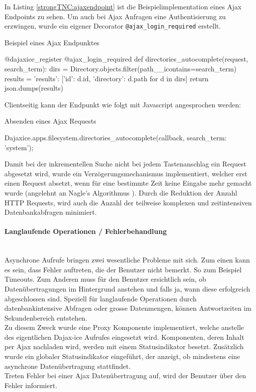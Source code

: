 In Listing \ref{strongTNC:ajaxendpoint} ist die Beispielimplementation eines Ajax Endpoints zu sehen. Um auch bei Ajax Anfragen eine Authentisierung zu erzwingen, wurde ein eigener Decorator \texttt{@ajax\_login\_required} erstellt. 

\begin{listing}[H]
\caption{Beispiel eines Ajax Endpunktes}
\label{strongTNC:ajaxendpoint}
\begin{pythoncode}
@dajaxice_register
@ajax_login_required
def directories_autocomplete(request, search_term):
    dirs = Directory.objects.filter(path__icontains=search_term)
    results = {'results': [{'id': d.id, 'directory': d.path} for d in dirs]}
    return json.dumps(results)
\end{pythoncode}
\end{listing}

Clientseitig kann der Endpunkt wie folgt mit Javascript angesprochen werden:
\begin{listing}[H]
\caption{Absenden eines Ajax Requests}
\begin{jscode}
Dajaxice.apps.filesystem.directories_autocomplete(callback, {search_term: 'system'});
\end{jscode} 
\end{listing}

Damit bei der inkrementellen Suche nicht bei jedem Tastenanschlag ein Request
abgesetzt wird, wurde ein Verzögerungsmechanismus implementiert, welcher erst einen Request
absetzt, wenn für eine bestimmte Zeit keine Eingabe mehr gemacht wurde (angelehnt an Nagle's Algorithmus \cite{nagle1984congestion}).
Durch die Reduktion der Anzahl HTTP Requests, wird auch die Anzahl der teilweise komplexen und zeitintensiven Datenbankabfragen minimiert.

\paragraph{Langlaufende Operationen / Fehlerbehandlung}\hspace{0pt}\\
Asynchrone Aufrufe bringen zwei wesentliche Probleme mit sich. Zum einen kann es
sein, dass Fehler auftreten, die der Benutzer nicht bemerkt. So zum Beispiel Timeouts.
Zum Anderen muss für den Benutzer ersichtlich sein, ob Datenübertragungen im
Hintergrund anstehen und falls ja, wann diese erfolgreich abgeschlossen sind.
Speziell für langlaufende Operationen durch datenbankintensive Abfragen oder
grosse Datenmengen, können Antwortzeiten im Sekundenbereich entstehen. \\
Zu diesem Zweck wurde eine Proxy Komponente \cite{gamma1994design}
implementiert, welche anstelle des eigentlichen Dajax-ice Aufrufes eingesetzt
wird. Komponenten, deren Inhalt per Ajax nachladen wird, werden mit
einem Statusindikator besetzt. Zusätzlich wurde ein globaler Statusindikator
eingeführt, der anzeigt, ob mindestens eine asynchrone Datenübertragung
stattfindet.\\
Treten Fehler bei einer Ajax Datenübertragung auf, wird der Benutzer über den Fehler informiert.

